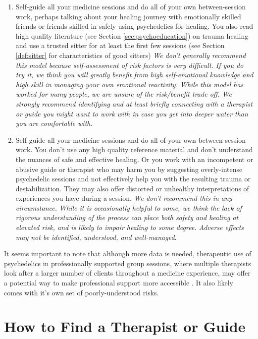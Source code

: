 \documentclass[12pt,letterpaper]{book}
\begin{document}
\begin{enumerate}
    \item Self-guide all your medicine sessions and do all of your own between-session work, perhaps talking about your healing journey with emotionally skilled friends or friends skilled in safely using psychedelics for healing. You also read high quality literature (see Section \ref{sec:psychoeducation}) on trauma healing and use a trusted sitter for at least the first few sessions (see Section \ref{def:sitter} for characteristics of good sitters) \textit{We don't generally recommend this model because self-assessment of risk factors is very difficult. If you do try it, we think you will greatly benefit from high self-emotional knowledge and high skill in managing your own emotional reactivity. While this model has worked for many people, we are unsure of the risk/benefit trade off. We strongly recommend identifying and at least briefly connecting with a therapist or guide you might want to work with in case you get into deeper water than you are comfortable with.}
    \item Self-guide all your medicine sessions and do all of your own between-session work. You don't use any high quality reference material and don't understand the nuances of safe and effective healing. Or you work with an incompetent or abusive guide or therapist who may harm you by suggesting overly-intense psychedelic sessions and not effectively help you with the resulting trauma or destabilization. They may also offer distorted or unhealthy interpretations of experiences you have during a session. \textit{We don't recommend this in any circumstance. While it is occasionally helpful to some, we think the lack of rigorous understanding of the process can place both safety and healing at elevated risk, and is likely to impair healing to some degree. Adverse effects may not be identified, understood, and well-managed}.
\end{enumerate}
It seems important to note that although more data is needed, therapeutic use of psychedelics in professionally supported group sessions, where multiple therapists look after a larger number of clients throughout a medicine experience, may offer a potential way to make professional support more accessible \cite{marseille2023group}. It also likely comes with it's own set of poorly-understood risks.

\section{How to Find a Therapist or Guide}
\label{sec:howtofind}
\end{document}
